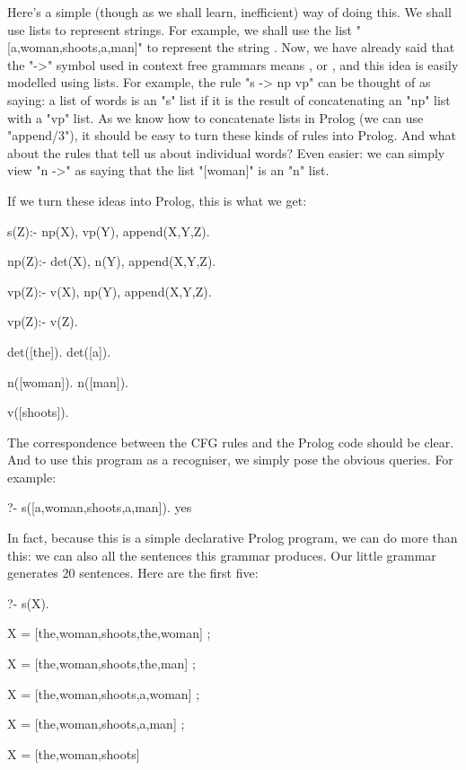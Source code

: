 Here's a simple (though as we shall learn, inefficient) way of doing
this.  We shall use lists to represent strings.  For example, we shall
use the list "[a,woman,shoots,a,man]" to represent the string
.  Now, we have already said that the
"->" symbol used in context free grammars means , or , and this idea is easily
modelled using lists.  For example, the rule "s -> np vp" can be
thought of as saying: a list of words is an "s" list if it is the
result of concatenating an "np" list with a "vp" list.  As we know how
to concatenate lists in Prolog (we can use "append/3"), it should be
easy to turn these kinds of rules into Prolog.  And what about the
rules that tell us about individual words?  Even easier: we can simply
view "n ->"  as saying that the list "[woman]" is an
"n" list.

If we turn these ideas into Prolog, this is what we get:
\begin{LPNcodedisplay}
s(Z):- np(X), vp(Y), append(X,Y,Z).

np(Z):- det(X), n(Y), append(X,Y,Z).

vp(Z):- v(X), np(Y), append(X,Y,Z).

vp(Z):- v(Z).

det([the]).
det([a]).

n([woman]).
n([man]).

v([shoots]).
\end{LPNcodedisplay}


The correspondence between the CFG rules and the Prolog code should be
clear.  And to use this program as a recogniser, we simply pose the
obvious queries.  For example:
\begin{LPNcodedisplay}
?- s([a,woman,shoots,a,man]).
yes
\end{LPNcodedisplay}

In fact, because this is a simple declarative Prolog program, we can
do more than this: we can also  all the sentences this
grammar produces.  Our little grammar generates 20 sentences.
Here are the first five:
\begin{LPNcodedisplay}
?- s(X).

X = [the,woman,shoots,the,woman] ;

X = [the,woman,shoots,the,man] ;

X = [the,woman,shoots,a,woman] ;

X = [the,woman,shoots,a,man] ;

X = [the,woman,shoots]
\end{LPNcodedisplay}

